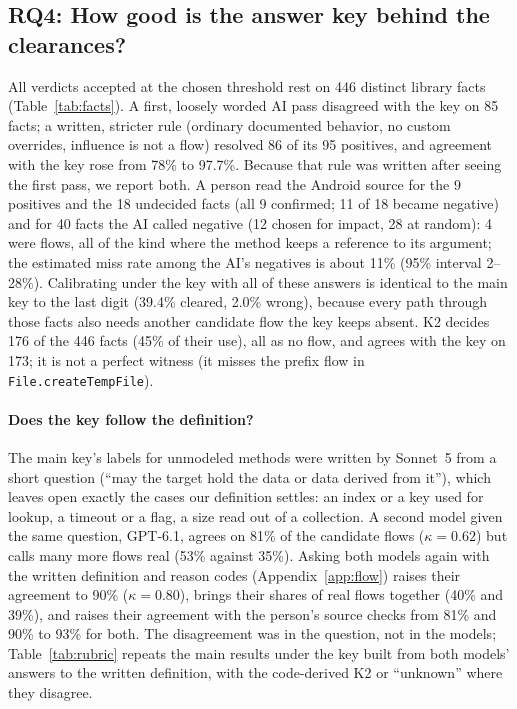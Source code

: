 \subsection{RQ4: How good is the answer key behind the clearances?}
\label{sec:rq4}
All verdicts accepted at the chosen threshold rest on 446 distinct library facts (Table~\ref{tab:facts}).
A first, loosely worded AI pass disagreed with the key on 85 facts; a written, stricter rule (ordinary documented behavior, no custom overrides, influence is not a flow) resolved 86 of its 95 positives, and agreement with the key rose from 78\% to 97.7\%.
Because that rule was written after seeing the first pass, we report both.
A person read the Android source for the 9 positives and the 18 undecided facts (all 9 confirmed; 11 of 18 became negative) and for 40 facts the AI called negative (12 chosen for impact, 28 at random): 4 were flows, all of the kind where the method keeps a reference to its argument; the estimated miss rate among the AI's negatives is about 11\% (95\% interval 2--28\%).
Calibrating under the key with all of these answers is identical to the main key to the last digit (39.4\% cleared, 2.0\% wrong), because every path through those facts also needs another candidate flow the key keeps absent.
K2 decides 176 of the 446 facts (45\% of their use), all as no flow, and agrees with the key on 173; it is not a perfect witness (it misses the prefix flow in \texttt{File.createTempFile}).
\paragraph{Does the key follow the definition?}
The main key's labels for unmodeled methods were written by Sonnet~5 from a short question (``may the target hold the data or data derived from it''), which leaves open exactly the cases our definition settles: an index or a key used for lookup, a timeout or a flag, a size read out of a collection.
A second model given the same question, GPT-6.1, agrees on 81\% of the candidate flows ($\kappa=0.62$) but calls many more flows real (53\% against 35\%).
Asking both models again with the written definition and reason codes (Appendix~\ref{app:flow}) raises their agreement to 90\% ($\kappa=0.80$), brings their shares of real flows together (40\% and 39\%), and raises their agreement with the person's source checks from 81\% and 90\% to 93\% for both.
The disagreement was in the question, not in the models; Table~\ref{tab:rubric} repeats the main results under the key built from both models' answers to the written definition, with the code-derived K2 or ``unknown'' where they disagree.

